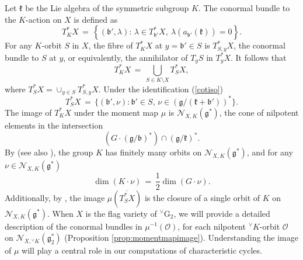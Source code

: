 \documentclass[a4paper, 11pt]{article}
\begin{document}
Let $\mathfrak{k}$ be the Lie algebra of the symmetric subgroup $K$. 
The conormal bundle to the $K$-action on $X$ is defined as 
$$T^{\ast}_{K}X\, =\, \left\{ (\mathfrak{b}',\lambda):\, \lambda \in
T_{\mathfrak{b}'}^{\ast}X,\ \lambda(a_{\mathfrak{b}'}(\mathfrak{k})) =
0\right\}.$$
For any $K$-orbit $S$ in $X$, the fibre of $T^{\ast}_{K}X$ at
$y = \mathfrak{b}' \in S$ is $T_{S,y}^{*}X$, the conormal bundle to $S$ at  
$y$, or equivalently,  the annihilator of $T_{y}S$ in
$T^{\ast}_{y}X$. 
It follows that
$$
T^{\ast}_{K}X\, =\, \bigcup_{S\in K\setminus X} T_{S}^{\ast}X,
$$
where $T_{S}^{*}X = \cup_{y \in S} T_{S,y}^{*}X$.
Under the identification (\ref{cotiso})
\begin{equation}\label{eq:TSX}
T_S^{\ast}X\, =\, \{
(\mathfrak{b}',\nu):\mathfrak{b}'\in S,\, \nu\in
(\mathfrak{g}/(\mathfrak{k}+\mathfrak{b}'))^{\ast} \}.
\end{equation}
The image of 
$T^{\ast}_{K}X$
under the moment map $\mu$ is $\mathcal{N}_{X,K}(\mathfrak{g}^\ast)$,
the cone of nilpotent elements in the intersection
$$
\left(G\cdot
(\mathfrak{g}/\mathfrak{b})^{\ast}\right)\cap(\mathfrak{g}/\mathfrak{k})^{\ast}. 
$$
By \cite{Kostant-Rallis} (see also \cite[Lemma 20.14]{ABV}), the group
$K$ has finitely many orbits on  
$\mathcal{N}_{X,K}(\mathfrak{g}^\ast)$, and for any $\nu\in
\mathcal{N}_{X,K}(\mathfrak{g}^\ast)$ 
$$\dim \left(K\cdot \nu\right)\, =\, \frac{1}{2}\dim \left(G\cdot
\nu\right).$$ 
Additionally, by \cite[{Lemma 20.16}]{ABV}, the image
$\mu\left(\overline{T^{\ast}_S X}\right)$ is the closure of a single
orbit of $K$ on  $\mathcal{N}_{X,K}(\mathfrak{g}^\ast)$.
When $X$ is the flag variety of ${}^\vee \mathrm{G}_{2}$, we will provide
a detailed description of the conormal bundles in $\mu^{-1}(\mathcal{O})$,  
for each nilpotent ${^\vee}K$-orbit $\mathcal{O}$ on
$\mathcal{N}_{X, {^\vee}K}(\mathfrak{g}_{2}^\ast)$ (Proposition
\ref{prop:momentmapimage}).  
Understanding the image of $\mu$ will play a central role in our
computations of characteristic cycles.
\end{document}
